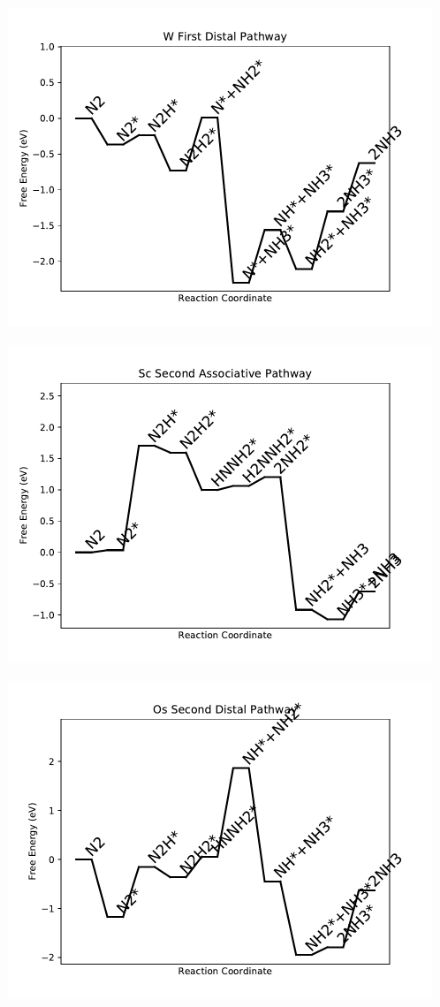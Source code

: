 \begin{figure}
\includegraphics[width=0.8\linewidth]{data/plots/W_distal_1.pdf}
\label{fig:W_distal_1}
\end{figure}

\begin{figure}
\includegraphics[width=0.8\linewidth]{data/plots/Sc_associative_2.pdf}
\label{fig:Sc_associative_2}
\end{figure}

\begin{figure}
\includegraphics[width=0.8\linewidth]{data/plots/Os_distal_2.pdf}
\label{fig:Os_distal_2}
\end{figure}

